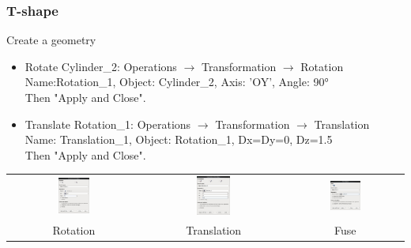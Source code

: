 \documentclass[10pt]{beamer}
\begin{document}
\begin{frame}
\frametitle{T-shape}
\begin{block}{Create a geometry}

\begin{itemize}
\item Rotate Cylinder\_2: Operations $\rightarrow$ Transformation $\rightarrow$ Rotation\\
Name:Rotation\_1, Object: Cylinder\_2, Axis: 'OY', Angle: 90° \\
Then "Apply and Close".

\item Translate Rotation\_1: Operations $\rightarrow$ Transformation $\rightarrow$ Translation\\
Name: Translation\_1, Object: Rotation\_1, Dx=Dy=0, Dz=1.5 \\
Then "Apply and Close".
\end{itemize}

\begin{center}
\begin{tabular}{ccc}
\includegraphics[width=0.25\textwidth]{PICTURES/salome11} & \includegraphics[width=0.25\textwidth]{PICTURES/salome12} & \includegraphics[width=0.28\textwidth]{PICTURES/salome13} \tabularnewline
Rotation & Translation & Fuse \tabularnewline
\end{tabular}
\end{center}

\end{block}
\end{frame}
\end{document}
